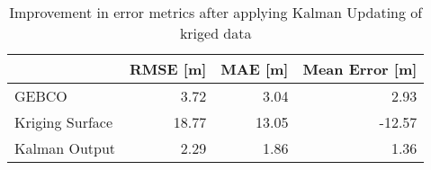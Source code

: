 \begin{table}
\centering
\caption{Improvement in error metrics after applying Kalman Updating of kriged data}
\label{tab:oahu1_gebco_raster_error}
\begin{tabular}{lrrr}
\toprule
 & RMSE [m] & MAE [m] & Mean Error [m] \\
\midrule
GEBCO & 3.72 & 3.04 & 2.93 \\
Kriging Surface & 18.77 & 13.05 & -12.57 \\
Kalman Output & 2.29 & 1.86 & 1.36 \\
\bottomrule
\end{tabular}
\end{table}
